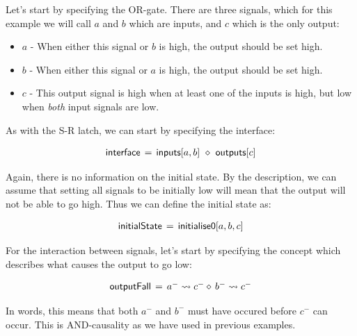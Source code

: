 \documentclass[british, journal]{IEEEtran}
\begin{document}
Let's start by specifying the OR-gate. There are three signals, which for this 
example we will call $a$ and $b$ which are inputs, and $c$ which is the only output:

\begin{itemize}
  \item $a$ - When either this signal or $b$ is high, the output should be set high.
  \item $b$ - When either this signal or $a$ is high, the output should be set high.
  \item $c$ - This output signal is high when at least one of the inputs is high, but low when
		\emph{both} input signals are low.
\end{itemize}

As with the S-R latch, we can start by specifying the interface: 

\vspace{-4mm}

\[
\begin{array}{lcl}
\mathsf{interface}&\hspace{-2mm}=&\hspace{-2mm}\mathsf{inputs}[a, b]~\diamond~\mathsf{outputs}[c]
\end{array}
\]

\noindent Again, there is no information on the initial state. By the description, we can
assume that setting all signals to be initially low will mean that the output
will not be able to go high. Thus we can define the initial state as:

\vspace{-2mm}

\[
\begin{array}{lcl}
\mathsf{initialState}&\hspace{-2mm}=&\hspace{-2mm}\mathsf{initialise0} [a, b, c]
\end{array}
\]

\noindent For the interaction between signals, let's start by specifying the concept which 
describes what causes the output to go low:

\vspace{-4mm}
\[
\begin{array}{lcl}
\mathsf{outputFall}&\hspace{-2mm}=&\hspace{-2mm}a^{-} \rightsquigarrow c^{-} \diamond\, b^{-} \rightsquigarrow c^{-}
\end{array}
\]

\noindent In words, this means that both $a^{-}$ and $b^{-}$ must have occured before $c^{-}$ can occur. 
This is AND-causality as we have used in previous examples. 
\end{document}
